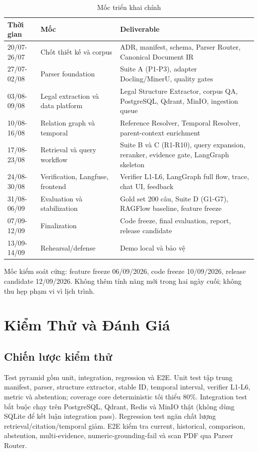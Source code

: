 \documentclass[a4paper,12pt]{extreport}
\begin{document}
\begin{table}[H]
\caption{Mốc triển khai chính}
\begin{tabularx}{\textwidth}{p{3.2cm}p{3.4cm}X}
\toprule
\textbf{Thời gian} & \textbf{Mốc} & \textbf{Deliverable}\\
\midrule
20/07-26/07 & Chốt thiết kế và corpus & ADR, manifest, schema, Parser Router, Canonical Document IR\\
27/07-02/08 & Parser foundation & Suite A (P1-P3), adapter Docling/MinerU, quality gates\\
03/08-09/08 & Legal extraction và data platform & Legal Structure Extractor, corpus QA, PostgreSQL, Qdrant, MinIO, ingestion queue\\
10/08-16/08 & Relation graph và temporal & Reference Resolver, Temporal Resolver, parent-context enrichment\\
17/08-23/08 & Retrieval và query workflow & Suite B và C (R1-R10), query expansion, reranker, evidence gate, LangGraph skeleton\\
24/08-30/08 & Verification, Langfuse, frontend & Verifier L1-L6, LangGraph full flow, trace, chat UI, feedback\\
31/08-06/09 & Evaluation và stabilization & Gold set 200 câu, Suite D (G1-G7), RAGFlow baseline, feature freeze\\
07/09-12/09 & Finalization & Code freeze, final evaluation, report, release candidate\\
13/09-14/09 & Rehearsal/defense & Demo local và bảo vệ\\
\bottomrule
\end{tabularx}
\end{table}

Mốc kiểm soát cứng: feature freeze 06/09/2026, code freeze 10/09/2026, release candidate 12/09/2026. Không thêm tính năng mới trong hai ngày cuối; không thu hẹp phạm vi vì lịch trình.

\chapter{Kiểm Thử và Đánh Giá}

\section{Chiến lược kiểm thử}

Test pyramid gồm unit, integration, regression và E2E. Unit test tập trung manifest, parser, structure extractor, stable ID, temporal interval, verifier L1-L6, metric và abstention; coverage core deterministic tối thiểu 80\%. Integration test bắt buộc chạy trên PostgreSQL, Qdrant, Redis và MinIO thật (không dùng SQLite để kết luận integration pass). Regression test ngăn chất lượng retrieval/citation/temporal giảm. E2E kiểm tra current, historical, comparison, abstention, multi-evidence, numeric-grounding-fail và scan PDF qua Parser Router.
\end{document}
